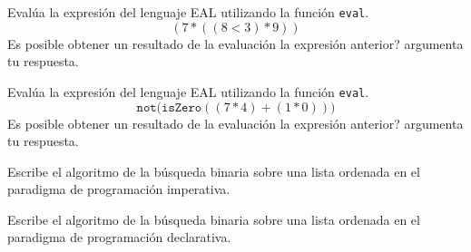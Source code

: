     \begin{exercise}
        Evalúa la expresión del lenguaje \textsf{EAL} utilizando la función \texttt{eval}. \\ 
        $$(7 * ((8 < 3) * 9))$$
	  Es posible obtener un resultado de la evaluación la expresión anterior? argumenta tu respuesta.
    \end{exercise}


    \begin{exercise}
        Evalúa la expresión del lenguaje \textsf{EAL} utilizando la función \texttt{eval}. \\ 
            $$\texttt{not(isZero}( (7 * 4) + (1 * 0)))$$
 Es posible obtener un resultado de la evaluación la expresión anterior? argumenta tu respuesta.
    \end{exercise}


    \begin{exercise}
        Escribe el algoritmo de la búsqueda binaria sobre una lista ordenada en el paradigma de programación imperativa.
    \end{exercise}

    \begin{exercise}
        Escribe el algoritmo de la búsqueda binaria sobre una lista ordenada en el paradigma de programación declarativa.
    \end{exercise}



